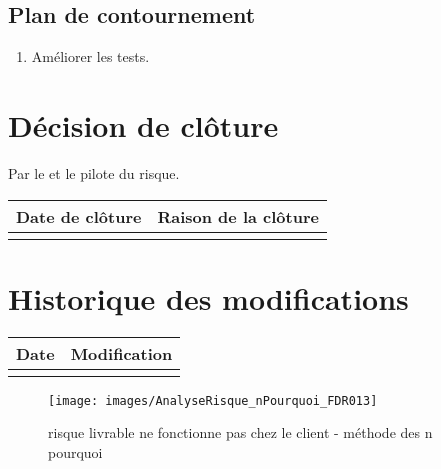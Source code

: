 \flushleft
\subsection*{Plan de contournement}

\begin{enumerate}
	\item Améliorer les tests. 
\end{enumerate}

\section*{Décision de clôture}
Par le \CP{} et le pilote du risque.
\begin{table}[H]
\centering
	\begin{tabularx}{16.8cm}{|X|X|}
	\hline
	\rowcolor{gray!40} Date de clôture & Raison de la clôture \\
	\hline
	  & \\
	\hline
	\end{tabularx}
\end{table}

\section*{Historique des modifications}
\begin{table}[H]
\centering
	\begin{tabularx}{16.8cm}{|X|X|}
	\hline
	\rowcolor{gray!40} Date & Modification \\
	\hline
	  & \\
	\hline
	\end{tabularx}
\end{table}
\newpage


\begin{figure}
	\centering
	\texttt{[image: images/AnalyseRisque\_nPourquoi\_FDR013]}
	\caption{\label{livrable fonctionne pas client}risque livrable ne fonctionne pas chez le client - méthode des n pourquoi}
\end{figure}